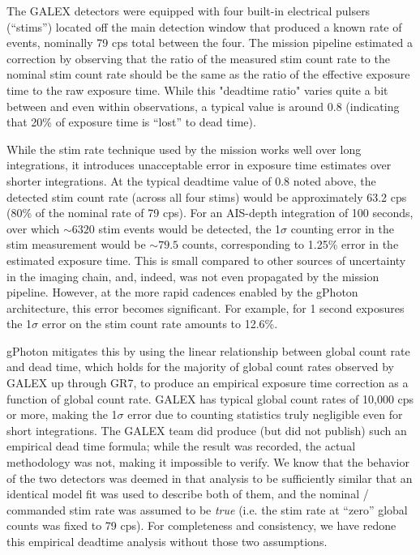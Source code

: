 \documentclass[preprint]{aastex}
\begin{document}
The GALEX detectors were equipped with four built-in electrical pulsers (``stims'') located off the main detection window that produced a known rate of events, nominally 79 cps total between the four. The mission pipeline estimated a correction by observing that the ratio of the measured stim count rate to the nominal stim count rate should be the same as the ratio of the effective exposure time to the raw exposure time. While this "deadtime ratio" varies quite a bit between and even within observations, a typical value is around 0.8 (indicating that 20\% of exposure time is ``lost'' to dead time).

While the stim rate technique used by the mission works well over long integrations, it introduces unacceptable error in exposure time estimates over shorter integrations. At the typical deadtime value of 0.8 noted above, the detected stim count rate (across all four stims) would be approximately 63.2 cps (80\% of the nominal rate of 79 cps). For an AIS-depth integration of 100 seconds, over which $\sim 6320$ stim events would be detected, the 1$\sigma$ counting error in the stim measurement would be $\sim 79.5$ counts, corresponding to 1.25\% error in the estimated exposure time. This is small compared to other sources of uncertainty in the imaging chain, and, indeed, was not even propagated by the mission pipeline. However, at the more rapid cadences enabled by the gPhoton architecture, this error becomes significant. For example, for 1 second exposures the 1$\sigma$ error on the stim count rate amounts to 12.6\%.

gPhoton mitigates this by using the linear relationship between global count rate and dead time, which holds for the majority of global count rates observed by GALEX up through GR7, to produce an empirical exposure time correction as a function of global count rate. GALEX has typical global count rates of 10,000 cps or more, making the 1$\sigma$ error due to counting statistics truly negligible even for short integrations. The GALEX team did produce (but did not publish) such an empirical dead time formula; while the result was recorded, the actual methodology was not, making it impossible to verify. We know that the behavior of the two detectors was deemed in that analysis to be sufficiently similar that an identical model fit was used to describe both of them, and the nominal / commanded stim rate was assumed to be \emph{true} (i.e. the stim rate at ``zero'' global counts was fixed to 79 cps). For completeness and consistency, we have redone this empirical deadtime analysis without those two assumptions.
\end{document}

